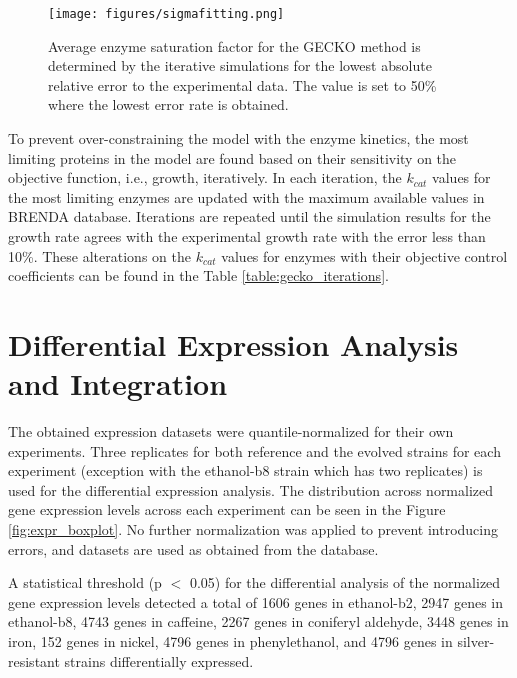 \begin{figure}[H]
  \begin{center}
    \texttt{[image: figures/sigmafitting.png]}
    \caption[Average enzyme saturation factor for the GECKO method is determined by the iterative simulations for the lowest absolute relative error to the experimental data]{Average enzyme saturation factor for the GECKO method is determined by the iterative simulations for the lowest absolute relative error to the experimental data. The value is set to 50\% where the lowest error rate is obtained.}
    \label{fig:sigma_fitting}
  \end{center}
\end{figure}

\vspace{-1cm}

To prevent over-constraining the model with the enzyme kinetics, the most limiting proteins in the model are found based on their sensitivity on the objective function, i.e., growth, iteratively. In each iteration, the $k_{cat}$ values for the most limiting enzymes are updated with the maximum available values in BRENDA\cite{jeske2019brenda} database. Iterations are repeated until the simulation results for the growth rate agrees with the experimental growth rate with the error less than 10\%. These alterations on the $k_{cat}$ values for enzymes with their objective control coefficients can be found in the Table \ref{table:gecko_iterations}.



\vspace{-0.5cm}

\section{Differential Expression Analysis and Integration}

The obtained expression datasets were quantile-normalized for their own experiments. Three replicates for both reference and the evolved strains for each experiment (exception with the ethanol-b8 strain which has two replicates) is used for the differential expression analysis. The distribution across normalized gene expression levels across each experiment can be seen in the Figure \ref{fig:expr_boxplot}. No further normalization was applied to prevent introducing errors, and datasets are used as obtained from the database.

A statistical threshold (p $<$ 0.05) for the differential analysis of the normalized gene expression levels detected a total of 1606 genes in ethanol-b2, 2947 genes in ethanol-b8, 4743 genes in caffeine, 2267 genes in coniferyl aldehyde, 3448 genes in iron, 152 genes in nickel, 4796 genes in phenylethanol, and 4796 genes in silver-resistant strains differentially expressed.

